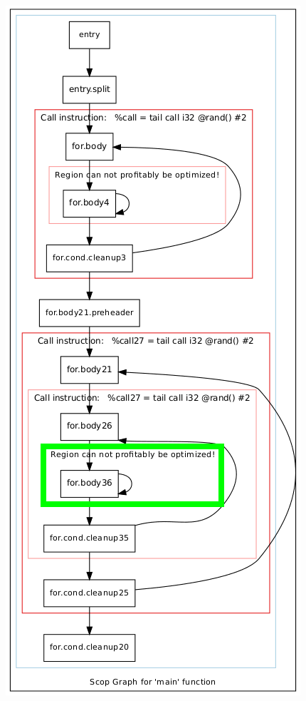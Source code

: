 \documentclass[aspectratio=169, xcolor=dvipsnames]{beamer}
\begin{document}
{\begin{frame}
        \includegraphics[height=1.2\textheight]{gfx/matmulScops(6).png}
    \end{frame}
}
\end{document}
